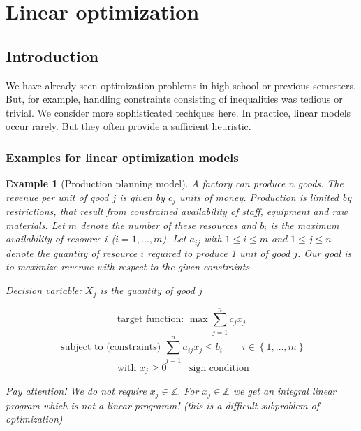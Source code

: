 \documentclass[a4paper]{article}
\numberwithin{lecref}{subsection}
\newcounter{exercises}
\newtheorem{example}[exercises]{Example}
\newcommand{\Set}[1]{\left\{#1\right\}}
\begin{document}
\section{Linear optimization}
\label{section:1} %
\setcounter{subsection}{-1}
\subsection{Introduction}
\label{section:1.1}

We have already seen optimization problems in high school or previous semesters.
But, for example, handling constraints consisting of inequalities was tedious or trivial.
We consider more sophisticated techiques here.
In practice, linear models occur rarely. But they often provide a sufficient heuristic.

\subsubsection{Examples for linear optimization models}

\begin{example}[Production planning model]
	\label{example:1}
	A factory can produce $n$ goods.
	The revenue per unit of good $j$ is given by $c_j$ units of money.
	Production is limited by restrictions, that result from constrained availability of staff, equipment and raw materials.
	Let $m$ denote the number of these resources and $b_i$ is the maximum availability of resource $i$ ($i = 1, \dots, m$).
	Let $a_{ij}$ with $1 \leq i \leq m$ and $1 \leq j \leq n$ denote the quantity of resource $i$ required to produce 1 unit of good $j$.
	Our goal is to maximize revenue with respect to the given constraints.

	\emph{Decision variable:} $X_j$ is the quantity of good $j$

	\[ \text{target function: } \max \sum_{j=1}^n c_j x_j \]
	\[ \text{ subject to (constraints) } \sum_{j=1}^n a_{ij} x_j \leq b_i \qquad i \in \Set{1, \dots, m} \]
	\[ \text{ with } x_j \geq 0 \qquad \text{ sign condition} \]

	Pay attention! We do not require $x_j \in \mathbb Z$. For $x_j \in \mathbb Z$ we get an integral linear program which is \emph{not} a linear programm! (this is a difficult subproblem of optimization)
\end{example}
\end{document}

